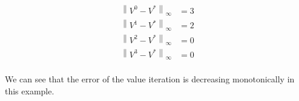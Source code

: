 
\begin{align*}
    \left\| V^0 - V^* \right\|_\infty &= 3 \\
    \left\| V^1 - V^* \right\|_\infty &= 2 \\
    \left\| V^2 - V^* \right\|_\infty &= 0 \\
    \left\| V^3 - V^* \right\|_\infty &= 0 \\
\end{align*}

We can see that the error of the value iteration is decreasing monotonically in this example.

